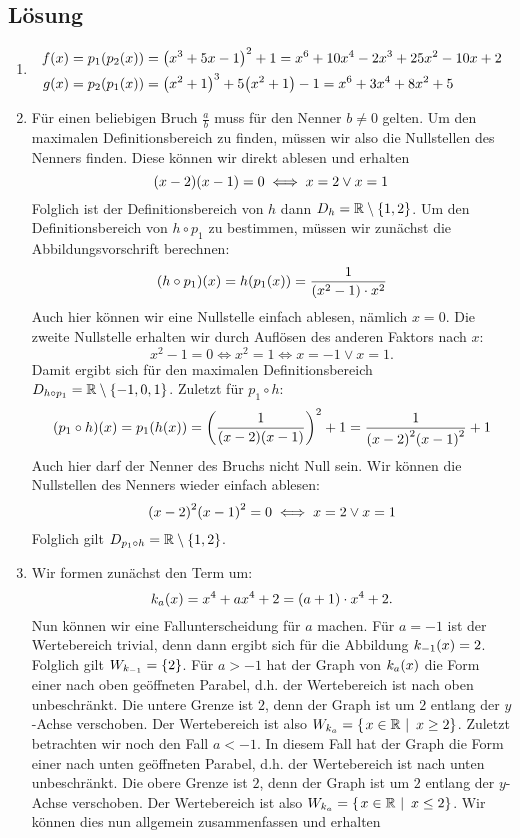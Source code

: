 \documentclass[german,12pt]{homework}
\newcommand{\RR}{\mathbb{R}}
\DeclarePairedDelimiter{\enbrace}{(}{)}
\DeclarePairedDelimiter{\penbrace}{\{}{\}}
\begin{document}
    \subsection*{Lösung}
    \begin{enumerate}
        \item
        \begin{align*}
            f\enbrace*{x} &= p_1\enbrace*{p_2\enbrace*{x}} = \enbrace*{x^3 + 5x - 1}^2 + 1 = x^6 + 10x^4 - 2x^3 + 25x^2 - 10x + 2\\
            g\enbrace*{x} &= p_2\enbrace*{p_1\enbrace*{x}} = \enbrace*{x^2 + 1}^3 + 5\enbrace*{x^2 + 1} - 1 = x^6 + 3x^4 + 8x^2 + 5
        \end{align*}
        \item Für einen beliebigen Bruch \(\frac{a}{b}\) muss für den Nenner \(b \ne 0\) gelten. Um den maximalen Definitionsbereich zu finden, müssen wir also die Nullstellen des Nenners finden. Diese können wir direkt ablesen und erhalten
        \[\enbrace*{x - 2}\enbrace*{x - 1} = 0 \iff x = 2 \lor x = 1\]
        Folglich ist der Definitionsbereich von \(h\) dann \(D_h = \RR \setminus \penbrace*{1, 2}\). Um den Definitionsbereich von \(h \circ p_1\) zu bestimmen, müssen wir zunächst die Abbildungsvorschrift berechnen:
        \[\enbrace*{h \circ p_1}\enbrace*{x} = h\enbrace*{p_1\enbrace*{x}} = \frac{1}{\enbrace{x^2 - 1} \cdot x^2}\]
        Auch hier können wir eine Nullstelle einfach ablesen, nämlich \(x = 0\). Die zweite Nullstelle erhalten wir durch Auflösen des anderen Faktors nach \(x\):
        \[x^2 - 1 = 0 \iff x^2 = 1 \iff x = -1 \lor x = 1.\]
        Damit ergibt sich für den maximalen Definitionsbereich \(D_{h \circ p_1} = \RR \setminus \penbrace*{-1, 0, 1}\). Zuletzt für \(p_1 \circ h\):
        \[\enbrace*{p_1 \circ h}\enbrace*{x} = p_1\enbrace*{h\enbrace*{x}} = \enbrace*{\frac{1}{\enbrace*{x - 2}\enbrace*{x - 1}}}^2 + 1 = \frac{1}{\enbrace*{x - 2}^2\enbrace*{x - 1}^2} + 1\]
        Auch hier darf der Nenner des Bruchs nicht Null sein. Wir können die Nullstellen des Nenners wieder einfach ablesen:
        \[\enbrace*{x - 2}^2\enbrace*{x - 1}^2 = 0 \iff x = 2 \lor x = 1\]
        Folglich gilt \(D_{p_1 \circ h} = \RR \setminus \penbrace*{1, 2}\).
        \item Wir formen zunächst den Term um:
        \[k_a\enbrace*{x} = x^4 + ax^4 + 2 = (a + 1) \cdot x^4 + 2.\]
        Nun können wir eine Fallunterscheidung für \(a\) machen. Für \(a = -1\) ist der Wertebereich trivial, denn dann ergibt sich für die Abbildung \(k_{-1}\enbrace*{x} = 2\). Folglich gilt \(W_{k_{-1}} = \penbrace*{2}\). Für \(a > -1\) hat der Graph von \(k_a\enbrace*{x}\) die Form einer nach oben geöffneten Parabel, d.h. der Wertebereich ist nach oben unbeschränkt. Die untere Grenze ist \(2\), denn der Graph ist um \(2\) entlang der \(y\)-Achse verschoben. Der Wertebereich ist also \(W_{k_a} = \penbrace*{\left.x \in \RR\ \right|\ x \ge 2}\). Zuletzt betrachten wir noch den Fall \(a < -1\). In diesem Fall hat der Graph die Form einer nach unten geöffneten Parabel, d.h. der Wertebereich ist nach unten unbeschränkt. Die obere Grenze ist \(2\), denn der Graph ist um \(2\) entlang der \(y\)-Achse verschoben. Der Wertebereich ist also \(W_{k_a} = \penbrace*{\left.x \in \RR\ \right|\ x \le 2}\). Wir können dies nun allgemein zusammenfassen und erhalten

\end{enumerate}
\end{document}

